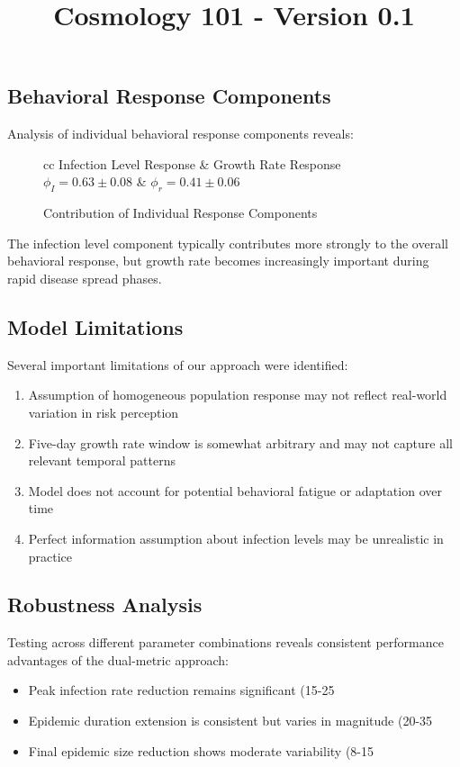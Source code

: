 \documentclass{article}\usepackage{graphicx} \usepackage{amsmath} \usepackage{colortbl}\title{Cosmology 101 - Version 0.1}
\begin{document}
\subsection{Behavioral Response Components}

Analysis of individual behavioral response components reveals:

\begin{figure}[h]
\caption{Contribution of Individual Response Components}
\begin{tabular}{cc}
Infection Level Response & Growth Rate Response \
$\phi_I = 0.63 \pm 0.08$ & $\phi_r = 0.41 \pm 0.06$ \
\end{tabular}
\end{figure}

The infection level component typically contributes more strongly to the overall behavioral response, but growth rate becomes increasingly important during rapid disease spread phases.

\subsection{Model Limitations}

Several important limitations of our approach were identified:

\begin{enumerate}
\item Assumption of homogeneous population response may not reflect real-world variation in risk perception
\item Five-day growth rate window is somewhat arbitrary and may not capture all relevant temporal patterns
\item Model does not account for potential behavioral fatigue or adaptation over time
\item Perfect information assumption about infection levels may be unrealistic in practice
\end{enumerate}

\subsection{Robustness Analysis}

Testing across different parameter combinations reveals consistent performance advantages of the dual-metric approach:

\begin{itemize}
\item Peak infection rate reduction remains significant (15-25%
\item Epidemic duration extension is consistent but varies in magnitude (20-35%
\item Final epidemic size reduction shows moderate variability (8-15%
\end{itemize}
\end{document}
